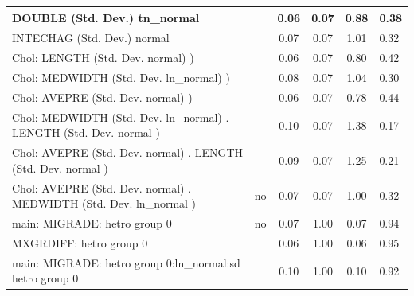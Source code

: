 \begin{table}
\begin{center}
\begin{tabular}{|l|l|c|c|c|l|}
			\hline
			DOUBLE (Std. Dev.) tn_normal &  & 0.06 & 0.07 & 0.88 & 0.38 \\
			\hline
			INTECHAG (Std. Dev.) normal &  & 0.07 & 0.07 & 1.01 & 0.32 \\
			\hline
			 Chol: LENGTH (Std. Dev. normal) ) &  & 0.06 & 0.07 & 0.80 & 0.42 \\
			\hline
			 Chol: MEDWIDTH (Std. Dev. ln_normal) ) &  & 0.08 & 0.07 & 1.04 & 0.30 \\
			\hline
			 Chol: AVEPRE (Std. Dev. normal) ) &  & 0.06 & 0.07 & 0.78 & 0.44 \\
			\hline
			 Chol: MEDWIDTH (Std. Dev. ln_normal) . LENGTH (Std. Dev.   normal ) &  & 0.10 & 0.07 & 1.38 & 0.17 \\
			\hline
			 Chol: AVEPRE (Std. Dev. normal) . LENGTH (Std. Dev.   normal ) &  & 0.09 & 0.07 & 1.25 & 0.21 \\
			\hline
			 Chol: AVEPRE (Std. Dev. normal) . MEDWIDTH (Std. Dev.   ln_normal ) & no & 0.07 & 0.07 & 1.00 & 0.32 \\
			\hline
			main: MIGRADE: hetro group 0 & no & 0.07 & 1.00 & 0.07 & 0.94 \\
			\hline
			MXGRDIFF: hetro group 0 &  & 0.06 & 1.00 & 0.06 & 0.95 \\
			\hline
			main: MIGRADE: hetro group 0:ln_normal:sd  hetro group 0 &  & 0.10 & 1.00 & 0.10 & 0.92 \\
			\hline
		\end{tabular}
	\end{center}
\end{table}